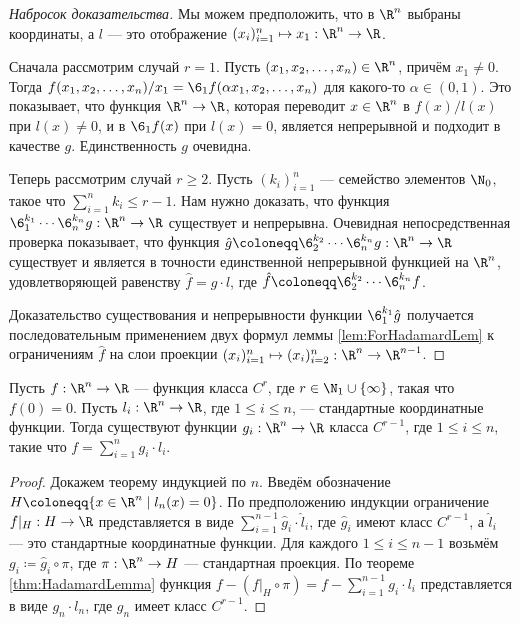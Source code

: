 \documentclass[
	extrafontsizes,
	11pt,
	hyphens,
]{memoir}
\begin{document}
\begin{proof}[Набросок доказательства]
Мы можем предположить, что в \(\R^n\) выбраны координаты, а \(l\) --- это отображение \((x_i)_{i=1}^n \mapsto x_1 : \R^n \to \R\).

Сначала рассмотрим случай \(r=1\).
Пусть \((x_1, x_2, \dots{}, x_n) \in \R^n\), причём \(x_1 \neq 0\). Тогда \(f(x_1, x_2, \dots{}, x_n)/x_1 = \6_1 f (\alpha x_1, x_2, \dots{}, x_n)\) для какого-то \(\alpha \in (0,1)\). Это показывает, что функция \(\R^n \to \R\), которая переводит \(x \in \R^n\) в \(f(x)/l(x)\) при \(l(x) \neq 0\), и в \(\6_1 f (x)\) при \(l(x) = 0\), является непрерывной и подходит в качестве \(g\).
Единственность \(g\) очевидна.

Теперь рассмотрим случай \(r \geq 2\).
Пусть \((k_i)_{i=1}^n\) --- семейство элементов \(\N_0\), такое что \(\sum_{i=1}^n k_i \leq r-1\).
Нам нужно доказать, что функция \(\6_1^{k_1} \cdots{} \6_n^{k_n} g : \R^n \to \R\) существует и непрерывна.
Очевидная непосредственная проверка показывает, что функция \(\hat{g} \coloneqq \6_2^{k_2} \cdots{} \6_n^{k_n} g : \R^n \to \R\) существует и является в точности единственной непрерывной функцией на \(\R^n\), удовлетворяющей равенству \(\hat{f} = \hat{g} \cdot l\),
где \(\hat{f} \coloneqq \6_2^{k_2} \cdots{} \6_n^{k_n} f\).

Доказательство существования и непрерывности функции \(\6_1^{k_1} \hat{g}\) получается последовательным применением двух формул леммы \ref{lem:ForHadamardLem} к ограничениям \(\hat{f}\) на слои проекции \((x_i)_{i=1}^n \mapsto (x_i)_{i=2}^n : \R^n \to \R^{n-1}\). 
\end{proof}

\begin{corollary}
\label{cor:HadamardLemma}
Пусть \(f : \R^n \to \R\) --- функция класса \(C^r\), где \(r \in \N_1 \cup \{\infty\}\), такая что \(f(0) = 0\).
Пусть \(l_i : \R^n \to \R\), где \(1 \leq i \leq n\), --- стандартные координатные функции.
Тогда существуют функции \(g_i : \R^n \to \R\) класса \(C^{r-1}\), где \(1 \leq i \leq n\), такие что
\(f = \sum_{i=1}^n g_i \cdot l_i\).
\end{corollary}

\begin{proof}
Докажем теорему индукцией по \(n\).
Введём обозначение \(H \coloneqq \{x \in \R^n \mid l_n(x) = 0\}\).
По предположению индукции ограничение \(f|_H : H \to \R\) представляется в виде \(\sum_{i=1}^{n-1} \hat{g}_i \cdot \hat{l}_i\), где \(\hat{g}_i\) имеют класс \(C^{r-1}\), а \(\hat{l}_i\) --- это стандартные координатные функции.
Для каждого \(1 \leq i \leq n - 1\) возьмём \(g_i \coloneqq \hat{g}_i \circ \pi\), где \(\pi : \R^n \to H\) --- стандартная проекция.
По теореме \ref{thm:HadamardLemma} функция
\(f - (f|_H \circ \pi) = f - \sum_{i=1}^{n-1} g_i \cdot l_i\) представляется в виде \(g_n \cdot l_n\), где \(g_n\) имеет класс \(C^{r-1}\).
\end{proof}
\end{document}
